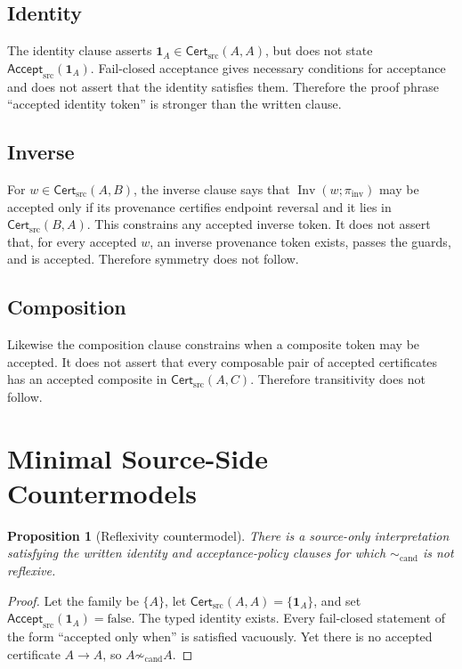 \documentclass[11pt]{article}
\newtheorem{proposition}{Proposition}
\newcommand{\Cert}{\mathsf{Cert}_{\mathrm{src}}}
\newcommand{\Accept}{\mathsf{Accept}_{\mathrm{src}}}
\begin{document}
\subsection{Identity}

The identity clause asserts
\(\mathbf 1_A\in\Cert(A,A)\), but does not state
\(\Accept(\mathbf 1_A)\). Fail-closed acceptance gives necessary conditions
for acceptance and does not assert that the identity satisfies them.
Therefore the proof phrase ``accepted identity token'' is stronger than the
written clause.

\subsection{Inverse}

For \(w\in\Cert(A,B)\), the inverse clause says that
\(\operatorname{Inv}(w;\pi_{\mathrm{inv}})\) may be accepted only if its
provenance certifies endpoint reversal and it lies in \(\Cert(B,A)\).
This constrains any accepted inverse token. It does not assert that, for every
accepted \(w\), an inverse provenance token exists, passes the guards, and is
accepted. Therefore symmetry does not follow.

\subsection{Composition}

Likewise the composition clause constrains when a composite token may be
accepted. It does not assert that every composable pair of accepted
certificates has an accepted composite in \(\Cert(A,C)\). Therefore
transitivity does not follow.

\section{Minimal Source-Side Countermodels}

\begin{proposition}[Reflexivity countermodel]
There is a source-only interpretation satisfying the written identity and
acceptance-policy clauses for which \(\sim_{\mathrm{cand}}\) is not reflexive.
\end{proposition}

\begin{proof}
Let the family be \(\{A\}\), let
\(\Cert(A,A)=\{\mathbf 1_A\}\), and set
\(\Accept(\mathbf 1_A)=\mathrm{false}\). The typed identity exists. Every
fail-closed statement of the form ``accepted only when'' is satisfied
vacuously. Yet there is no accepted certificate \(A\to A\), so
\(A\not\sim_{\mathrm{cand}}A\).
\end{proof}
\end{document}
